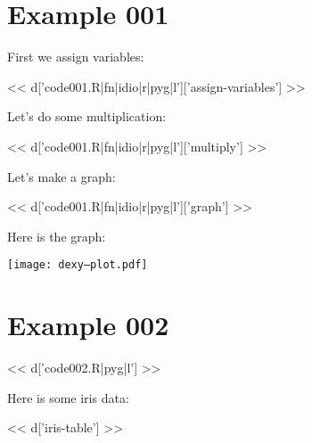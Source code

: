 \section{Example 001}

First we assign variables:

<< d['code001.R|fn|idio|r|pyg|l']['assign-variables'] >>

Let's do some multiplication:

<< d['code001.R|fn|idio|r|pyg|l']['multiply'] >>

Let's make a graph:

<< d['code001.R|fn|idio|r|pyg|l']['graph'] >>

Here is the graph:

\texttt{[image: dexy--plot.pdf]}

\section{Example 002}

<< d['code002.R|pyg|l'] >>

Here is some iris data:

<< d['iris-table'] >>


